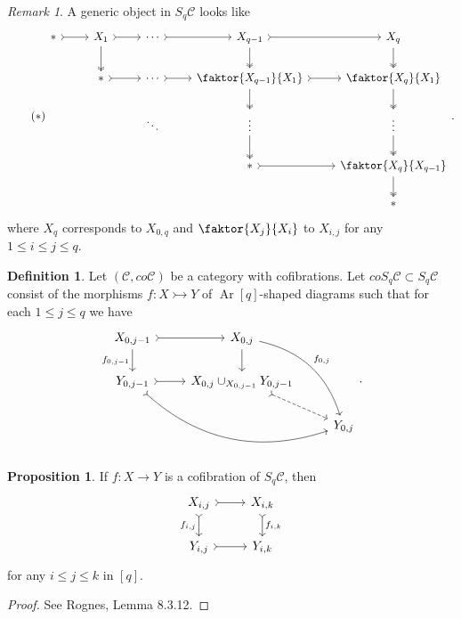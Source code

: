 \documentclass[10pt,letterpaper,cm]{nupset}
\theoremstyle{definition}
\newtheorem{definition}{Definition}
\theoremstyle{theorem}
\newtheorem{prop}[theorem]{Proposition}
\theoremstyle{remark}
\newtheorem{remark}{Remark}
\newcommand{\1}{\mathbf{1}}
\renewcommand{\c}{\mathscr{C}}
\newcommand{\0}{\vec 0}
\DeclareMathOperator{\Ar}{Ar}
\begin{document}
\begin{remark}
A generic object in $S_q\c$ looks like
\[ \tag{$\ast$}
\begin{tikzcd}
\ast \arrow[r, tail] & X_1 \arrow[r, tail] \arrow[d, two heads] & \cdots \arrow[r, tail] & X_{q-1} \arrow[r, tail] \arrow[d, two heads] & X_q \arrow[d, two heads] \\
 & \ast \arrow[r, tail] & \cdots \arrow[r, tail] & \faktor{X_{q-1}}{X_1} \arrow[d, two heads] \arrow[r, tail] & \faktor{X_q}{X_1} \arrow[d, two heads] \\
 &  & \ddots & \vdots \arrow[d, two heads] & \vdots \arrow[d, two heads] \\
 &  &  & \ast \arrow[r, tail] & \faktor{X_q}{X_{q-1}} \arrow[d, two heads] \\
 &  &  &  & \ast
\end{tikzcd}.
\] where $X_q$ corresponds to $X_{0, q}$ and $\faktor{X_j}{X_i}$ to $X_{i, j}$ for any $1 \leq i \leq j \leq q$. 
\end{remark}

\begin{definition}
Let $(\c, co\c)$ be a category with cofibrations. Let $coS_q\c \subset S_q \c$ consist of the morphisms $f: X \rightarrowtail Y$ of $\Ar[q]$-shaped diagrams such that for each $1\leq j \leq q$ we have
\[
\begin{tikzcd}
{X_{0, j-1}} \arrow[d, "{f_{0, j-1}}"'] \arrow[r, tail] & {X_{0, j}} \arrow[d] \arrow[rdd, "{f_{0, j}}", bend left] &  \\
{Y_{0, j-1}} \arrow[r, tail] \arrow[rrd, tail, bend right] & {X_{0, j} \cup_{X_{0, j-1}} Y_{0, j-1}} \arrow[rd, dashed, tail] &  \\
 &  & {Y_{0, j}}
\end{tikzcd}.
\]
\end{definition}

\begin{prop}
If $f: X \to Y$ is a cofibration of $S_q\c$, then 
\[
\begin{tikzcd}
{X_{i, j}} \arrow[d, "{f_{i,j}}"', tail] \arrow[r, tail] & {X_{i, k}} \arrow[d, "{f_{i,k}}", tail] \\
{Y_{i, j}} \arrow[r, tail] & {Y_{i,k}}
\end{tikzcd}
\] for any $i \leq j \leq k$ in $[q]$.
\end{prop}
\begin{proof}
See Rognes, Lemma 8.3.12.
\end{proof}
\end{document}
